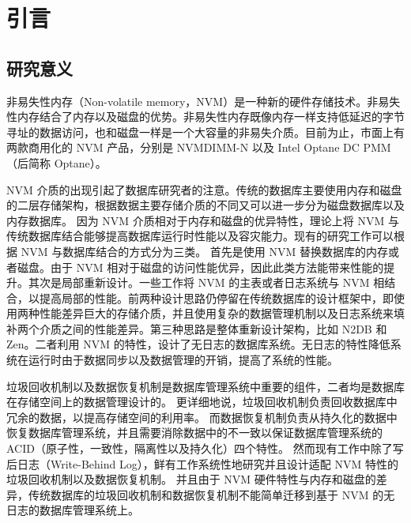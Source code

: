 
\chapter{引言}

\section{研究意义}

非易失性内存（Non-volatile memory，NVM）是一种新的硬件存储技术。非易失性内存结合了内存以及磁盘的优势。非易失性内存既像内存一样支持低延迟的字节寻址的数据访问，也和磁盘一样是一个大容量的非易失介质。目前为止，市面上有两款商用化的 NVM 产品，分别是 NVMDIMM-N 以及 Intel Optane DC PMM（后简称 Optane）。\cite{zhangkun1994}

NVM 介质的出现引起了数据库研究者的注意。传统的数据库主要使用内存和磁盘的二层存储架构，根据数据主要存储介质的不同又可以进一步分为磁盘数据库以及内存数据库。
因为 NVM 介质相对于内存和磁盘的优异特性，理论上将 NVM 与传统数据库结合能够提高数据库运行时性能以及容灾能力。现有的研究工作可以根据 NVM 与数据库结合的方式分为三类。
首先是使用 NVM 替换数据库的内存或者磁盘。由于 NVM 相对于磁盘的访问性能优异，因此此类方法能带来性能的提升。其次是局部重新设计。一些工作将 NVM 的主表或者日志系统与 NVM 相结合，以提高局部的性能。前两种设计思路仍停留在传统数据库的设计框架中，即使用两种性能差异巨大的存储介质，并且使用复杂的数据管理机制以及日志系统来填补两个介质之间的性能差异。第三种思路是整体重新设计架构，比如 N2DB\cite{} 和 Zen\cite{}。二者利用 NVM 的特性，设计了无日志的数据库系统。无日志的特性降低系统在运行时由于数据同步以及数据管理的开销，提高了系统的性能。


垃圾回收机制以及数据恢复机制是数据库管理系统中重要的组件，二者均是数据库在存储空间上的数据管理设计的。
更详细地说，垃圾回收机制负责回收数据库中冗余的数据，以提高存储空间的利用率。
而数据恢复机制负责从持久化的数据中恢复数据库管理系统，并且需要消除数据中的不一致以保证数据库管理系统的 ACID（原子性，一致性，隔离性以及持久化）四个特性。
然而现有工作中除了写后日志（Write-Behind Log）\cite{}，鲜有工作系统性地研究并且设计适配 NVM 特性的垃圾回收机制以及数据恢复机制。
并且由于 NVM 硬件特性与内存和磁盘的差异，传统数据库的垃圾回收机制和数据恢复机制不能简单迁移到基于 NVM 的无日志的数据库管理系统上。

